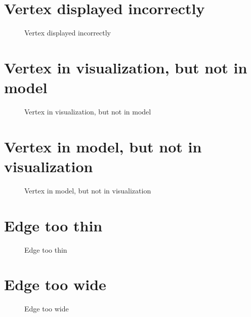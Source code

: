\documentclass{article}
\begin{document}
\section{Vertex displayed incorrectly}
\begin{figure}[H]
    \centering
    \caption{Vertex displayed incorrectly}
\end{figure}
\newpage

\section{Vertex in visualization, but not in model}
\begin{figure}[H]
    \centering
    \caption{Vertex in visualization, but not in model}
\end{figure}
\newpage

\section{Vertex in model, but not in visualization}
\begin{figure}[H]
    \centering
    \caption{Vertex in model, but not in visualization}
\end{figure}
\newpage

\section{Edge too thin}
\begin{figure}[H]
    \centering
    \caption{Edge too thin}
\end{figure}
\newpage

\section{Edge too wide}
\begin{figure}[H]
    \centering
    \caption{Edge too wide}
\end{figure}
\newpage
\end{document}
